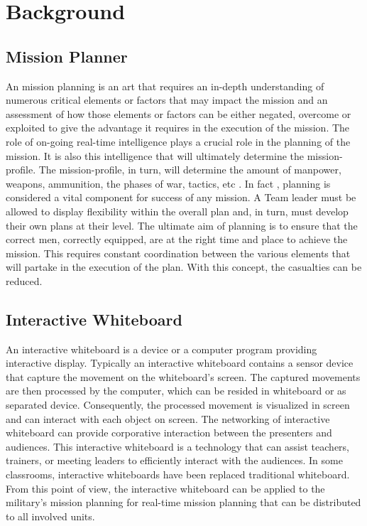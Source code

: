 \documentclass[conference]{IEEEtran}
\begin{document}
\section{Background}

\subsection{Mission Planner}
An mission planning is an art that requires an in-depth understanding of numerous critical elements or factors that may impact the mission and an assessment of how those elements or factors can be either negated, overcome or exploited to give the advantage it requires in the execution of the mission. 
The role of on-going real-time intelligence plays a crucial role in the planning of the mission. 
It is also this intelligence that will ultimately determine the mission-profile. 
The mission-profile, in turn, will determine the amount of manpower, weapons, ammunition, the phases of war, tactics, etc \cite{AB}.
In fact , planning is considered a vital component for success of any mission. 
A Team leader must be allowed to display flexibility within the overall plan and, in turn, must develop their own plans at their level. 
The ultimate aim of planning is to ensure that the correct men, correctly equipped, are at the right time and place to achieve the mission. 
This requires constant coordination between the various elements that will partake in the execution of the plan. 
With this concept, the casualties can be reduced. 

\subsection{Interactive Whiteboard}

An interactive whiteboard is a device or a computer program providing interactive display.
Typically an interactive whiteboard contains a sensor device that capture the movement on the whiteboard’s screen. 
The captured movements are then processed by the computer, which can be resided in whiteboard or as separated device. 
Consequently, the processed movement is visualized in screen and can interact with each object on screen. 
The networking of interactive whiteboard can provide corporative interaction between the presenters and audiences. 
This interactive whiteboard is a technology that can assist teachers, trainers, or meeting leaders to efficiently interact with the audiences. 
In some classrooms, interactive whiteboards have been replaced traditional whiteboard. 
From this point of view, the interactive whiteboard can be applied to the military's mission planning for real-time mission planning that can be distributed to all involved units.
\end{document}
